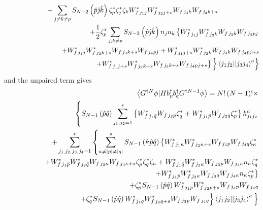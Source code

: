 \documentclass{article}
\begin{document}
\begin{eqnarray}
&&  \notag \\
&&+\sum_{j\neq k\neq p}S_{N-2}\left( \hat{p}\hat{\jmath}\hat{k}\right) \zeta
_{p}^{\ast }\zeta _{j}^{\ast }\zeta _{k}W_{f\,j_{1}j}^{\ast
}W_{f\,j_{2}j+s}^{\ast }W_{f\,j_{3}k}W_{f\,j_{4}k+s}\qquad \qquad \qquad 
\notag \\
&&\qquad \quad +\frac{1}{2}\zeta _{p}^{\ast }\sum_{j,k\neq p}S_{N-3}\left( 
\hat{p}\hat{\jmath}\hat{k}\right) n_{j}n_{k}\left\{ W_{f\,j_{1}j}^{\ast
}W_{f\,j_{2}k}^{\ast }W_{f\,j_{3}k}W_{f\,j_{4}pj}\right.  \notag \\
&&\qquad \qquad \qquad +W_{f\,j_{1}j}^{\ast }W_{f\,j_{2}k+s}^{\ast
}W_{f\,j_{3}k+s}W_{f\,j_{4}pj}+W_{f\,j_{1}j+s}^{\ast }W_{f\,j_{2}k}^{\ast
}W_{f\,j_{3}k}W_{f\,j_{4}pj+s}  \notag \\
&&\qquad \qquad \qquad \qquad \qquad \qquad \left. \left. \left.
+W_{f\,j_{1}j+s}^{\ast }W_{f\,j_{2}k+s}^{\ast
}W_{f\,j_{3}k+s}W_{f\,j_{4}pj+s}\right\} \underset{}{\overset{}{}}\right\}
\left\langle j_{1}j_{2}||j_{3}j_{4}\right\rangle ^{a}\right\}
\end{eqnarray}%
and the unpaired term gives 
\begin{eqnarray}
&&\left\langle G^{\dagger N}\phi |Hb_{p}^{\dagger }b_{q}^{\dagger
}G^{\dagger N-1}\phi \right\rangle =N!\left( N-1\right) !\times  \notag \\
&&\left\{ S_{N-1}\left( \hat{p}\hat{q}\right)
\sum_{j_{1},j_{2}=1}^{r}\left\{ W_{f\,j_{1}\bar{q}}^{\ast
}W_{f\,j_{2}p}\zeta _{q}^{\ast }+W_{f\,j_{1}\bar{p}}^{\ast
}W_{f\,j_{2}q}\zeta _{p}^{\ast }\right\} h_{j_{1}j_{2}}^{a}\right.  \notag \\
&&+\sum_{j_{1,}j_{2,}j_{3,}j_{4}=1}^{r}\left\{ \sum_{\kappa \neq \left|
p\right| \neq \left| q\right| }^{s}S_{N-1}\left( \hat{\kappa}\hat{p}\hat{q}%
\right) \left\{ W_{f\,j_{1}\kappa }^{\ast }W_{f\,j_{2}\kappa +s}^{\ast
}W_{f\,j_{3}p}W_{f\,j_{4}q}\zeta _{\kappa }^{\ast }\right. \right.  \notag \\
&&\quad \qquad \quad +W_{f\,j_{1}\bar{p}}^{\ast }W_{f\,j_{2}\bar{q}}^{\ast
}W_{f\,j_{3}\kappa }W_{f\,j_{4}\kappa +s}\zeta _{p}^{\ast }\zeta _{q}^{\ast
}\zeta _{\kappa }+W_{f\,j_{1}\bar{q}}^{\ast }W_{f\,j_{2}\kappa }^{\ast
}W_{f\,j_{3}p}W_{f\,j_{4}\kappa }n_{\kappa }\zeta _{q}^{\ast }  \notag \\
&&\qquad \qquad \qquad \qquad \qquad \qquad \qquad \qquad \qquad \qquad
\left. +W_{f\,j_{1}\bar{p}}^{\ast }W_{f\,j_{2}\kappa }^{\ast
}W_{f\,j_{3}q}W_{f\,j_{4}\kappa }n_{\kappa }\zeta _{p}^{\ast }\right\} 
\notag \\
&&+\zeta _{p}^{\ast }S_{N-1}\left( \hat{p}\hat{q}\right) W_{f\,j_{1}p}^{\ast
}W_{f\,j_{2}p+s}^{\ast }W_{f\,j_{3}p}W_{f\,j_{4}q}  \notag \\
&&\qquad \qquad \qquad \qquad \left. \left. +\zeta _{q}^{\ast }S_{N-1}\left( 
\hat{p}\hat{q}\right) W_{f\,j_{1}q}^{\ast }W_{f\,j_{2}q+s}^{\ast
}W_{f\,j_{3}p}W_{f\,j_{4}q}\underset{}{\overset{}{}}\right\} \left\langle
j_{1}j_{2}||j_{3}j_{4}\right\rangle ^{a}\underset{}{\overset{}{}}\right\}
\end{eqnarray}
\end{document}
